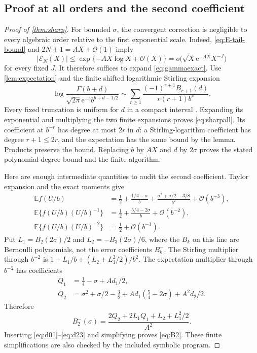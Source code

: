 \documentclass[11pt,a4paper]{article}
\theoremstyle{definition}
\numberwithin{equation}{section}
\newcommand{\ee}{\mathrm{e}}
\newcommand{\Oh}{\mathcal O}
\newcommand{\E}{\mathbb E}
\newcommand{\ctail}{\mathcal E}
\begin{document}
\subsection{Proof at all orders and the second coefficient}
\begin{proof}[Proof of \cref{thm:sharp}]
For bounded $\sigma$, the convergent correction is negligible to every
algebraic order relative to the first exponential scale. Indeed,
\eqref{eq:E-tail-bound} and $2N+1=AX+\Oh(1)$ imply
\begin{equation}
 |\ctail_N(X)|
 \le\exp\{-AX\log X+\Oh(X)\}
 =o\bigl(\sqrt X\ee^{-AX}X^{-J}\bigr)
 \label{eq:Esuper}
\end{equation}
for every fixed $J$. It therefore suffices to expand \eqref{eq:gammaexact}.
Use \cref{lem:expectation} and the finite shifted logarithmic Stirling
expansion
\begin{equation}
 \log\frac{\Gamma(b+d)}{\sqrt{2\pi}\ee^{-b}b^{b+d-1/2}}
 \sim\sum_{r\ge1}\frac{(-1)^{r+1}B_{r+1}(d)}{r(r+1)b^r}.
 \label{eq:stirlingall}
\end{equation}
Every fixed truncation is uniform for $d$ in a compact interval
\cite{dlmf511}. Expanding its exponential and multiplying the two finite
expansions proves \eqref{eq:sharpall}. Its coefficient at $b^{-r}$ has
degree at most $2r$ in $d$: a Stirling-logarithm coefficient has degree
$r+1\le2r$, and the expectation has the same bound by the lemma.
Products preserve the bound. Replacing $b$ by $AX$ and $d$ by $2\sigma$
proves the stated polynomial degree bound and the finite algorithm.

Here are enough intermediate quantities to audit the second coefficient.
Taylor expansion and the exact moments give
\begin{align*}
 \E f(U/b)
 &=\frac12+\frac{1/4-\sigma}{b}
       +\frac{\sigma^2+\sigma/2-3/8}{b^2}+\Oh(b^{-3}),\\
 \E\{f(U/b)(U/b)^{-1}\}
 &=\frac12+\frac{5/4-2\sigma}{b}+\Oh(b^{-2}),\\
 \E\{f(U/b)(U/b)^{-2}\}&=\frac12+\Oh(b^{-1}).
\end{align*}
Put $L_1=B_2(2\sigma)/2$ and $L_2=-B_3(2\sigma)/6$,
where the $B_k$ on this line are Bernoulli polynomials, not the error
coefficients $B_k^-$. The Stirling multiplier through $b^{-2}$ is
$1+L_1/b+(L_2+L_1^2/2)/b^2$.
The expectation multiplier through $b^{-2}$ has coefficients
\begin{align*}
 Q_1&=\tfrac14-\sigma+Ad_1/2,\\
 Q_2&=\sigma^2+\sigma/2-\tfrac38
                  +Ad_1(\tfrac54-2\sigma)+A^2d_2/2.
\end{align*}
Therefore
\[
 B_2^-(\sigma)=\frac{2Q_2+2L_1Q_1+L_2+L_1^2/2}{A^2}.
\]
Inserting \eqref{eq:d01}--\eqref{eq:d23} and simplifying proves
\eqref{eq:B2}. These finite simplifications are also checked by the
included symbolic program.
\end{proof}
\end{document}
